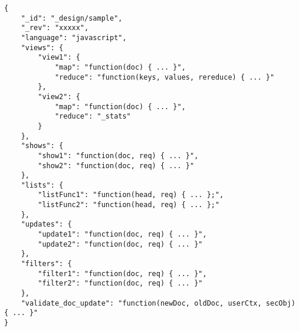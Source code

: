 \label{couchdb-design-doc-sample}
\begin{verbatim}
{
    "_id": "_design/sample",
    "_rev": "xxxxx",
    "language": "javascript",
    "views": {
        "view1": {
            "map": "function(doc) { ... }",
            "reduce": "function(keys, values, rereduce) { ... }"
        },
        "view2": {
            "map": "function(doc) { ... }",
            "reduce": "_stats"            
        }
    },
    "shows": {
        "show1": "function(doc, req) { ... }",
        "show2": "function(doc, req) { ... }"
    },
    "lists": {
        "listFunc1": "function(head, req) { ... };",
        "listFunc2": "function(head, req) { ... };"
    },
    "updates": {
        "update1": "function(doc, req) { ... }",
        "update2": "function(doc, req) { ... }"
    },
    "filters": {
        "filter1": "function(doc, req) { ... }",
        "filter2": "function(doc, req) { ... }"
    },
    "validate_doc_update": "function(newDoc, oldDoc, userCtx, secObj) { ... }"
}
\end{verbatim}